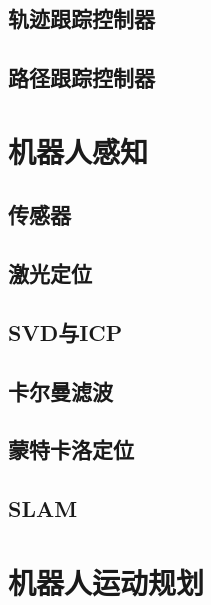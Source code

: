\documentclass[
12pt, %
a4paper, 
oneside, %
headinclude,footinclude, %
]{scrartcl}
\begin{document}
\subsection{轨迹跟踪控制器}
\subsection{路径跟踪控制器}
\section{机器人感知}
\subsection{传感器}
\subsection{激光定位}
\subsection{SVD与ICP}
\subsection{卡尔曼滤波}
\subsection{蒙特卡洛定位}
\subsection{SLAM}
\section{机器人运动规划}
\end{document}
